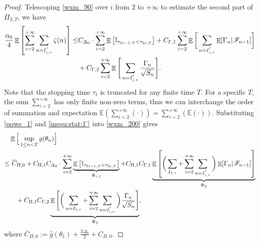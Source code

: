 \documentclass[standalone]{article}
\newcommand{\I}{\mathbb{I}}
\DeclareMathOperator{\Expect}{\mathbb{E}}
\begin{document}
\begin{proof}
Telescoping \cref{wxm_90} over $i$ from \(2\) to \(+\infty\) to estimate the second part of $\Pi_{3,T}$, we have
\begin{align}\label{pqwe_1}
\frac{\alpha_{0}}{4}\Expect\left[\sum_{i=2}^{+\infty}\sum_{n=I_{i,\tau}^{'}}\zeta(n)\right]\le& C_{\Delta_{0}}\cdot\sum_{i=2}^{+\infty}\Expect\big[\I_{\tau_{3i-1,T}<\tau_{3i,T}}\big]+C_{\Gamma,1}\sum_{i=2}^{+\infty}\Expect\bigg[\sum_{n=I_{i,\tau}^{'}} \Expect[\Gamma_n|\mathscr{F}_{n-1}]\bigg] \notag \\&+C_{\Gamma,2}\sum_{i=2}^{+\infty}\Expect\Bigg[\sum_{n=I_{i,\tau}^{'}}\frac{\Gamma_{n}}{\sqrt{S_{n}}}\Bigg].
\end{align}
Note that the stopping time \(\tau_{t}\) is truncated for any finite time \(T\). For a specific $T$, the sum \(\sum_{i=2}^{+\infty}\) has only finite non-zero terms, thus we can interchange the order of summation and expectation \(\mathbb{E}\left(\sum_{i=2}^{+\infty} (\cdot) \right) = \sum_{i=2}^{+\infty} \left(\mathbb{E}(\cdot) \right).\) Substituting \cref{pqwe_1} and \cref{inequ:stat:1'} into \cref{wxm_200} gives
\begin{align}\label{wxm_110}
&\Expect\Big[\sup_{1\le n< T}g(\theta_{n})\Big]\notag \\
\le&\ \overline{C}_{\Pi,0}+ C_{\Pi,1}C_{\Delta_{0}}\cdot\sum_{i=2}^{+\infty}\underbrace{\Expect\big[\I_{\tau_{3i-1,T}<\tau_{3i,T}}\big]}_{\Psi_{i,1}}+C_{\Pi,1}C_{\Gamma,1}\underbrace{\Expect\left[\bigg(\sum_{I_{1,\tau}}+\sum_{i=2}^{+\infty}\sum_{n=I_{i,\tau}^{'}} \bigg)\Expect[\Gamma_n|\mathscr{F}_{n-1}]\right]}_{\Psi_{2}} \notag \\&\quad +C_{\Pi,1}C_{\Gamma,2}\underbrace{\Expect\Bigg[\bigg(\sum_{n=I_{1,\tau}}+\sum_{i=2}^{+\infty}\sum_{n=I_{i,\tau}^{'}} \bigg)\frac{\Gamma_{n}}{\sqrt{S_{n}}}\Bigg]}_{\Psi_{3}},
\end{align}
where $\overline{C}_{\Pi,0}:=\hat{g}(\theta_{1})+\frac{3\Delta_{0}}{2}+C_{\Pi,0}.$ 
\end{proof}
\end{document}
